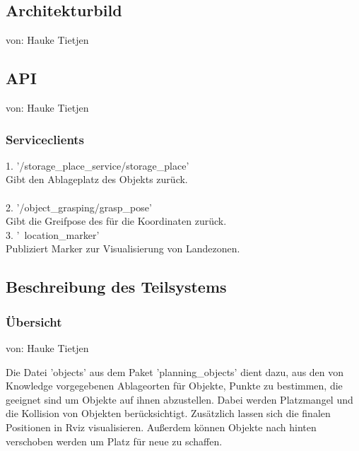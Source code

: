 \documentclass{suturo}
\makeatletter
\newcommand{\chapterauthor}[1]{%
  {\parindent0pt\vspace*{-27pt}%
  \linespread{0}\small\begin{flushright}von: #1\end{flushright}%
  \par\nobreak\vspace*{0pt}}
  \@afterheading%
}
\makeatother
\begin{document}
\subsection{Architekturbild}
\chapterauthor{Hauke Tietjen}



\begin{figure}[!htb]
\end{figure}


\subsection{API}
\chapterauthor{Hauke Tietjen}
\subsubsection{Serviceclients}
1. '/storage\_place\_service/storage\_place' \\
Gibt den Ablageplatz des Objekts zur\"uck.\\ \\
2. '/object\_grasping/grasp\_pose' \\
Gibt die Greifpose des für die Koordinaten zurück.\\
3. '~location\_marker' \\
Publiziert Marker zur Visualisierung von Landezonen.
\subsection{Beschreibung des Teilsystems}
\subsubsection{\"Ubersicht}
\chapterauthor{Hauke Tietjen}
Die Datei 'objects' aus dem Paket 'planning\_objects' dient dazu, aus den von Knowledge vorgegebenen Ablageorten für Objekte, Punkte zu bestimmen, die geeignet sind um Objekte auf ihnen abzustellen. Dabei werden Platzmangel und die Kollision von Objekten berücksichtigt. Zusätzlich lassen sich die finalen Positionen in Rviz visualisieren. Außerdem können Objekte nach hinten verschoben werden um Platz für neue zu schaffen.
\end{document}
